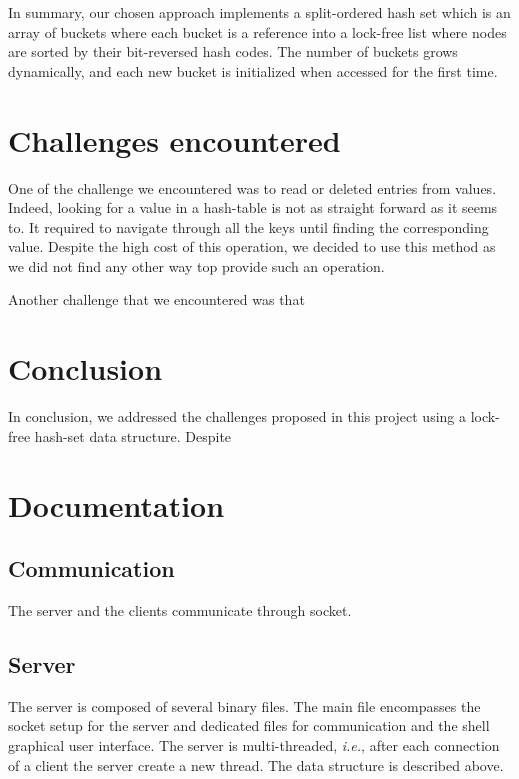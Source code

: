 \documentclass[a4paper,11pt]{report}
\begin{document}
    In summary, our chosen approach implements a split-ordered hash set which is an array of buckets where each bucket is a reference into a lock-free list where nodes are sorted by their bit-reversed hash codes.
    The number of buckets grows dynamically, and each new bucket is initialized when accessed for the first time.

    \section*{Challenges encountered}
    One of the challenge we encountered was to read or deleted entries from values.
    Indeed, looking for a value in a hash-table is not as straight forward as it seems to.
    It required to navigate through all the keys until finding the corresponding value.
    Despite the high cost of this operation, we decided to use this method as we did not find any other way top provide such an operation.

    Another challenge that we encountered was that

    \section*{Conclusion}
    In conclusion, we addressed the challenges proposed in this project using a lock-free hash-set data structure.
    Despite
    \printbibliography

    \newpage

    \section*{Documentation}

    \subsection*{Communication}
    The server and the clients communicate through socket.

    \subsection*{Server}
    The server is composed of several binary files.
    The main file encompasses the socket setup for the server and dedicated files for communication and the shell graphical user interface.
    The server is multi-threaded, \textit{i.e.}, after each connection of a client the server create a new thread.
    The data structure is described above.
\end{document}

